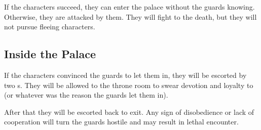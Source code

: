 If the characters succeed, they can enter the palace without the guards knowing. Otherwise, they are attacked by them. They will fight to the death, but they will not pursue fleeing characters.



\subsection{Inside the Palace}

If the characters convinced the guards to let them in, they will be escorted by two \enemyQueensGuard{}s. They will be allowed to the throne room to swear devotion and loyalty to \npcQueen{} (or whatever was the reason the guards let them in). 

After that they will be escorted back to exit. Any sign of disobedience or lack of cooperation will turn the guards hostile and may result in lethal encounter.


